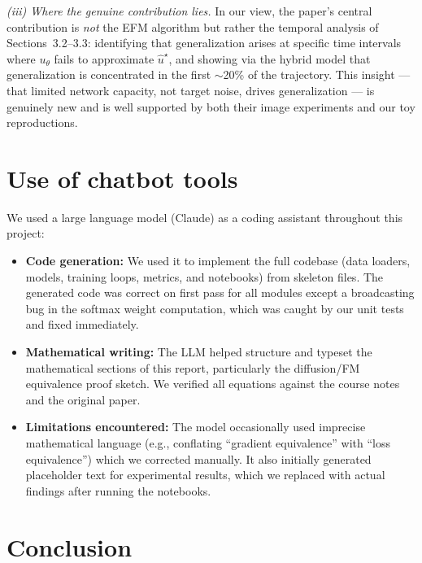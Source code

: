 \documentclass[10pt,a4paper]{article}
\theoremstyle{definition}
\begin{document}
\emph{(iii) Where the genuine contribution lies.}
In our view, the paper's central contribution is \emph{not} the EFM algorithm but rather the temporal analysis of Sections~3.2--3.3: identifying that generalization arises at specific time intervals where $u_\theta$ fails to approximate $\hat{u}^\star$, and showing via the hybrid model that generalization is concentrated in the first ${\sim}$20\% of the trajectory.
This insight --- that limited network capacity, not target noise, drives generalization --- is genuinely new and is well supported by both their image experiments and our toy reproductions.

\section{Use of chatbot tools}\label{sec:tools}

We used a large language model (Claude) as a coding assistant throughout this project:
\begin{itemize}[leftmargin=1.5em]
    \item \textbf{Code generation:} We used it to implement the full codebase (data loaders, models, training loops, metrics, and notebooks) from skeleton files. The generated code was correct on first pass for all modules except a broadcasting bug in the softmax weight computation, which was caught by our unit tests and fixed immediately.
    \item \textbf{Mathematical writing:} The LLM helped structure and typeset the mathematical sections of this report, particularly the diffusion/FM equivalence proof sketch. We verified all equations against the course notes and the original paper.
    \item \textbf{Limitations encountered:} The model occasionally used imprecise mathematical language (e.g., conflating ``gradient equivalence'' with ``loss equivalence'') which we corrected manually. It also initially generated placeholder text for experimental results, which we replaced with actual findings after running the notebooks.
\end{itemize}

\section{Conclusion}\label{sec:conclusion}
\end{document}
